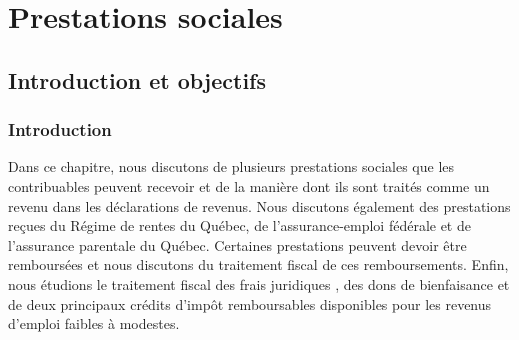 \chapter{Prestations sociales}
\section{Introduction et objectifs}
\subsection{Introduction}
Dans ce chapitre, nous discutons de plusieurs prestations sociales que les contribuables peuvent recevoir et de la manière dont ils sont traités comme un revenu dans les déclarations de revenus. Nous discutons également des prestations reçues du Régime de rentes du Québec, de l'assurance-emploi fédérale et de l'assurance parentale du Québec. Certaines prestations peuvent devoir être remboursées et nous discutons du traitement fiscal de ces remboursements. Enfin, nous étudions le traitement fiscal des frais juridiques , des dons de bienfaisance et de deux principaux crédits d'impôt remboursables disponibles pour les revenus d'emploi faibles à modestes.


